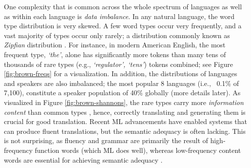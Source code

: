One complexity that is common across the whole spectrum of languages as well as within each language is \textit{data imbalance}. 
In any natural language, the word type distribution is very skewed. A few word types occur very frequently, and a vast majority of types occur only rarely; a distribution commonly known as \textit{Zipfian} distribution \cite{zipf1949human,powers-1998-zipf-apps}. 
For instance, in modern American English, the most frequent type, \textit{`the'}, alone has significantly more tokens than many tens of thousands of rare types (e.g., \textit{`regulator', `tens'}) tokens combined; see Figure \ref{fig:brown-freqs} for a visualization. In addition, the distributions of languages and speakers are also imbalanced; the most popular 8 languages (i.e., ~0.1\% of 7,100), constitute a speaker population of 40\% globally (more details later). As visualized in Figure \ref{fig:brown-shannons}, the rare types carry more \textit{information content} than common types \cite{shannon1948mathematical}, hence, correctly translating and generating them is crucial for good translation. Recent ML advancements have enabled systems that can produce fluent translations, but the semantic adequacy is often lacking. 
This is not surprising, as fluency and grammar are primarily the result of high-frequency function words (which ML does well), whereas low-frequency content words are essential for achieving semantic adequacy \cite{morrow-1986-discourse,kestemont-2014-function}.

